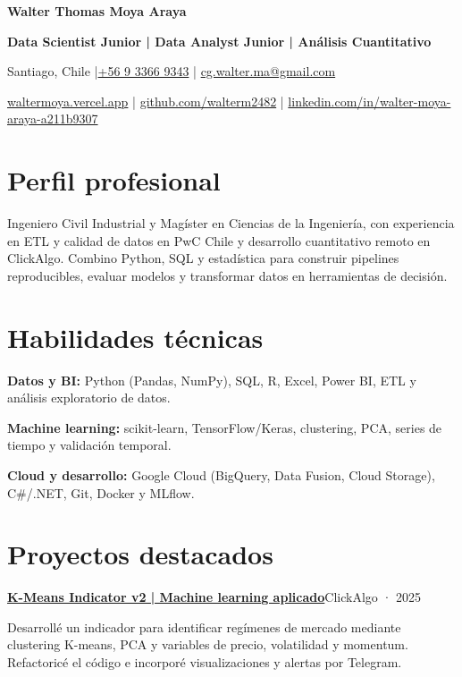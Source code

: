 \documentclass[10pt,a4paper]{article}
\newcommand{\project}[3]{\par\addvspace{3pt}\textbf{\href{#1}{#2}}\hfill{\fontsize{9.5}{11}\selectfont\color{muted}#3}\par\nopagebreak}
\begin{document}
\fontsize{10.7}{12.5}\selectfont
\RaggedRight
{}

{\fontsize{23}{26}\selectfont\bfseries\color{navy}Walter Thomas Moya Araya}\par
{\fontsize{11}{13}\selectfont\bfseries Data Scientist Junior | Data Analyst Junior | Análisis Cuantitativo}\par
{\fontsize{9.7}{11.5}\selectfont
Santiago, Chile \enspace|\enspace \href{tel:+56933669343}{+56 9 3366 9343} \enspace|\enspace
\href{mailto:cg.walter.ma@gmail.com}{cg.walter.ma@gmail.com}\par
\href{https://waltermoya.vercel.app/}{waltermoya.vercel.app} \enspace|\enspace
\href{https://github.com/walterm2482}{github.com/walterm2482} \enspace|\enspace
\href{https://www.linkedin.com/in/walter-moya-araya-a211b9307/}{linkedin.com/in/walter-moya-araya-a211b9307}}

\section{Perfil profesional}
Ingeniero Civil Industrial y Magíster en Ciencias de la Ingeniería, con experiencia en ETL y calidad de datos
en PwC Chile y desarrollo cuantitativo remoto en ClickAlgo. Combino Python, SQL y estadística para construir
pipelines reproducibles, evaluar modelos y transformar datos en herramientas de decisión.

\section{Habilidades técnicas}
\textbf{Datos y BI:} Python (Pandas, NumPy), SQL, R, Excel, Power BI, ETL y análisis exploratorio de datos.\par
\textbf{Machine learning:} scikit-learn, TensorFlow/Keras, clustering, PCA, series de tiempo y validación temporal.\par
\textbf{Cloud y desarrollo:} Google Cloud (BigQuery, Data Fusion, Cloud Storage), C\#/.NET, Git, Docker y MLflow.

\section{Proyectos destacados}
\project{https://clickalgo.com/k-means}{K-Means Indicator v2 | Machine learning aplicado}{ClickAlgo · 2025}
Desarrollé un indicador para identificar regímenes de mercado mediante clustering K-means, PCA y variables
de precio, volatilidad y momentum. Refactoricé el código e incorporé visualizaciones y alertas por Telegram.
\end{document}
